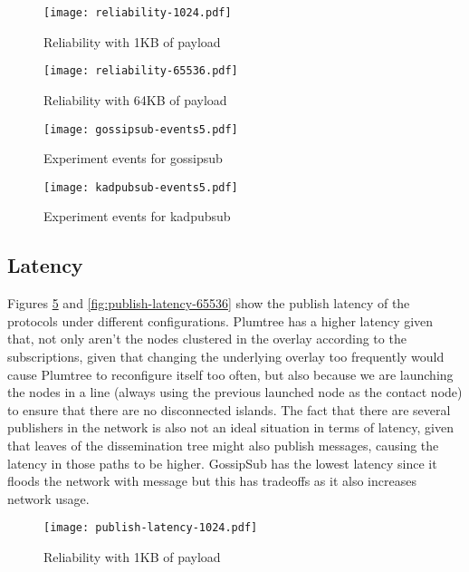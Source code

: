 \documentclass[sigconf]{acmart}
\begin{document}
\begin{figure}[htp]
    \centering
    \texttt{[image: reliability-1024.pdf]}
    \caption{Reliability with 1KB of payload}
    \label{fig:reliability-1024}
\end{figure}

\begin{figure}[htp]
    \centering
    \texttt{[image: reliability-65536.pdf]}
    \caption{Reliability with 64KB of payload}
    \label{fig:reliability-65536}
\end{figure}

\begin{figure}[htp]
    \centering
    \texttt{[image: gossipsub-events5.pdf]}
    \caption{Experiment events for gossipsub}
    \label{fig:gossipsub-events5}
\end{figure}

\begin{figure}[htp]
    \centering
    \texttt{[image: kadpubsub-events5.pdf]}
    \caption{Experiment events for kadpubsub}
    \label{fig:kadpubsub-events5}
\end{figure}

\subsection{Latency}
Figures \ref{fig:publish-latency-1024} and \ref{fig:publish-latency-65536} show the publish latency of the protocols under different configurations. Plumtree has a higher latency given that, not only aren't the nodes clustered in the overlay according to the subscriptions, given that changing the underlying overlay too frequently would cause Plumtree to reconfigure itself too often, but also because we are launching the nodes in a line (always using the previous launched node as the contact node) to ensure that there are no disconnected islands. The fact that there are several publishers in the network is also not an ideal situation in terms of latency, given that leaves of the dissemination tree might also publish messages, causing the latency in those paths to be higher. GossipSub has the lowest latency since it floods the network with message but this has tradeoffs as it also increases network usage.

\begin{figure}[htp]
    \centering
    \texttt{[image: publish-latency-1024.pdf]}
    \caption{Reliability with 1KB of payload}
    \label{fig:publish-latency-1024}
\end{figure}
\end{document}
